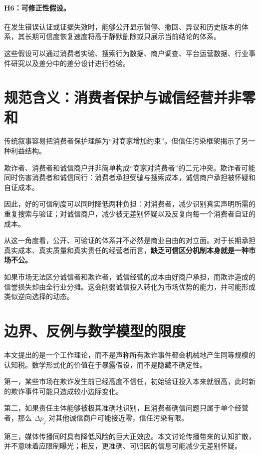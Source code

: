 \documentclass[UTF8,12pt]{ctexart}
\begin{document}
\paragraph{H6：可修正性假设。}
在发生错误认证或证据失效时，能够公开显示暂停、撤回、异议和历史版本的体系，其长期可信度恢复速度将高于静默删除或只展示当前结论的体系。

这些假设可以通过消费者实验、搜索行为数据、商户调查、平台运营数据、行业事件研究以及差分中的差分设计进行检验。

\section{规范含义：消费者保护与诚信经营并非零和}

传统叙事容易把消费者保护理解为“对商家增加约束”。但信任污染框架揭示了另一种利益结构。

欺诈者、消费者和诚信商户并非简单构成“商家对消费者”的二元冲突。欺诈者可能同时伤害消费者和诚信同行：消费者承担受骗与搜索成本，诚信商户承担被怀疑和自证成本。

因此，好的可信制度可以同时降低两种负担：对消费者，减少识别真实声明所需的重复搜索与验证；对诚信商户，减少被无差别怀疑以及反复向每一个消费者自证的成本。

从这一角度看，公开、可验证的体系并不必然是商业自由的对立面。对于长期承担真实成本、真实质量和真实责任的经营者而言，\textbf{缺乏可信区分机制本身就是一种市场不公。}

如果市场无法区分诚信者和欺诈者，诚信经营的成本由好商户承担，而欺诈造成的信誉损失却由全行业分摊。这会削弱诚信投入转化为市场优势的能力，并可能形成类似逆向选择的动态。

\section{边界、反例与数学模型的限度}

本文提出的是一个工作理论，而不是声称所有欺诈事件都会机械地产生同等规模的认知税。数学形式化的价值在于暴露假设，而不是隐藏不确定性。

第一，某些市场在欺诈发生前已经高度不信任，初始验证投入本来就很高，此时新的欺诈事件可能只造成较小边际变化。

第二，如果责任主体能够被极其准确地识别，且消费者确信问题只属于单个经营者，那么 $\Delta p_j$ 对其他诚信商户可能接近零，信任污染有限。

第三，媒体传播同时具有降低风险的巨大正效应。本文讨论传播带来的认知扩散，并不意味着应限制曝光；相反，更准确、可归因的信息可能减少无差别怀疑。
\end{document}
